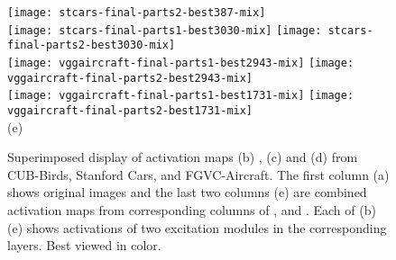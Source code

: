 \documentclass[10pt,twocolumn,letterpaper]{article}
\begin{document}
\begin{figure*}[t]
\begin{center}
\begin{minipage}{0.21\linewidth}
\texttt{[image: stcars-final-parts2-best387-mix]}\\
\texttt{[image: stcars-final-parts1-best3030-mix]}
\texttt{[image: stcars-final-parts2-best3030-mix]}\\
\texttt{[image: vggaircraft-final-parts1-best2943-mix]}
\texttt{[image: vggaircraft-final-parts2-best2943-mix]}\\
\texttt{[image: vggaircraft-final-parts1-best1731-mix]}
\texttt{[image: vggaircraft-final-parts2-best1731-mix]}\\
\centering (e)
\end{minipage}
\end{center}
\caption{Superimposed display of activation maps (b) , (c)  and (d)   from CUB-Birds, Stanford Cars, and FGVC-Aircraft. The first column (a) shows original images and the last two columns (e) are combined activation maps from corresponding columns of ,  and  . Each of (b)(e) shows activations of two excitation modules in the corresponding layers. Best viewed in color.} 
\label{fig:acm}
\end{figure*}
\end{document}
